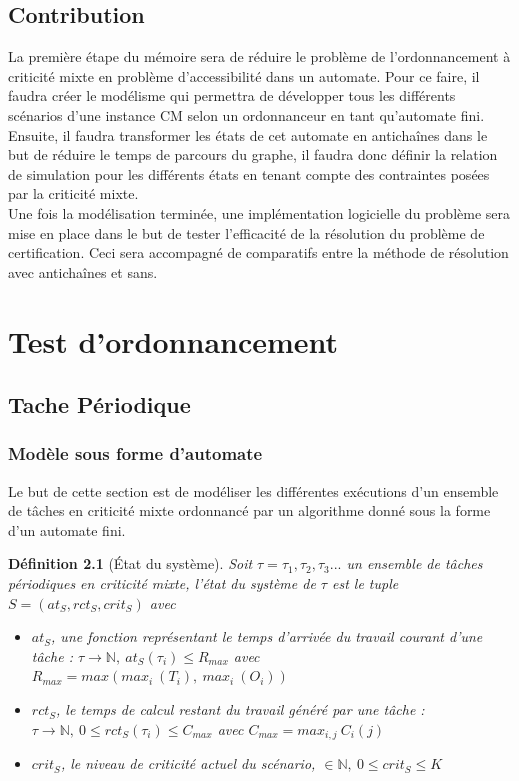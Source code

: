 \documentclass[a4paper]{report}
\theoremstyle{break}
\newtheorem{defin}{Définition}
\begin{document}
\section{Contribution}

La première étape du mémoire sera de réduire le problème de l'ordonnancement à criticité mixte en problème d'accessibilité dans un automate. Pour ce faire, il faudra créer le modélisme qui permettra de développer tous les différents scénarios d'une instance CM selon un ordonnanceur en tant qu'automate fini.\\

Ensuite, il faudra transformer les états de cet automate en antichaînes dans le but de réduire le temps de parcours du graphe, il faudra donc définir la relation de simulation pour les différents états en tenant compte des contraintes posées par la criticité mixte.\\

Une fois la modélisation terminée, une implémentation logicielle du problème sera mise en place dans le but de tester l'efficacité de la résolution du problème de certification. Ceci sera accompagné de comparatifs entre la méthode de résolution avec antichaînes et sans.


\chapter{Test d'ordonnancement}
\section{Tache Périodique}
\subsection{Modèle sous forme d'automate}

Le but de cette section est de modéliser les différentes exécutions d'un ensemble de tâches en criticité mixte ordonnancé par un algorithme donné sous la forme d'un automate fini.\\

\begin{defin}[État du système]
Soit $\tau = \tau_1, \tau_2, \tau_3 ...$ un ensemble de tâches périodiques en criticité mixte, l'état du système de $\tau$ est le tuple $S = (at_S, rct_S, crit_S)$ avec

\begin{itemize}
\item $at_S$, une fonction représentant le temps d'arrivée du travail courant d'une tâche : $\tau \rightarrow \mathbb{N},\ at_S(\tau_i) \leq R_{max}$ avec $R_{max} = max(max_i\ (T_i),\ max_i\ (O_i))$
\item $rct_S$, le temps de calcul restant du travail généré par une tâche : $ \tau \rightarrow \mathbb{N},\ 0 \leq rct_S(\tau_i) \leq C_{max}$ avec $C_{max} = max_{i,j}\ C_i(j)$
\item $crit_S$, le niveau de criticité actuel du scénario, $ \in \mathbb{N},\ 0 \leq crit_S \leq K$

\end{itemize}

\end{defin}
\end{document}
